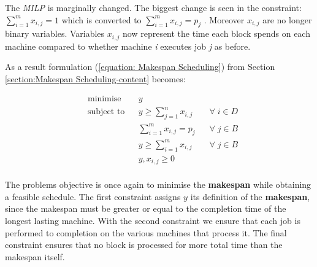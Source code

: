 \vspace{\baselineskip}
\noindent
The \textit{MILP} is marginally changed. The biggest change is seen in the constraint: $\sum _{i=1}^m x_{i,j} = 1$ which is converted to $\sum _{i=1}^m x_{i,j} = p_j$ \cite{DUMMY:2}. Moreover $x_{i,j}$ are no longer binary variables. Variables $x_{i,j}$ now represent the time each block spends on each machine compared to whether machine \textit{i} executes job \textit{j} as before.

\vspace{\baselineskip}
\noindent
As a result formulation (\ref{equation: Makespan Scheduling}) from Section \ref{section:Makespan Scheduling-content} becomes:


\vspace{\baselineskip}
\begin{equation}
\label{equation: Makespan preemptive}
\begin{aligned}
&\text{minimise}
& & y  \\ 
& \text{subject to}
& & y\geq \sum _{j=1}^n x_{i,j}  \;\;\; &\forall \; i \in D\\   
& & &\sum _{i=1}^m x_{i,j} = p_j \;\;\; &\forall \; j \in B\\
& & &y \geq \sum _{i=1}^m x_{i,j}  \;\;\; &\forall \; j \in B\\
& & & y,x_{i,j}\geq 0  \\
\end{aligned}
\end{equation}

\vspace{\baselineskip}
\noindent
The problems objective is once again to minimise the \textbf{makespan} while obtaining a feasible schedule. The first constraint assigns $y$ its definition of the \textbf{makespan}, since the makespan must be greater or equal to the completion time of the longest lasting machine. With the second constraint we ensure that each job is performed to completion on the various machines that process it. The final constraint ensures that no block is processed for more total time than the makespan itself.

